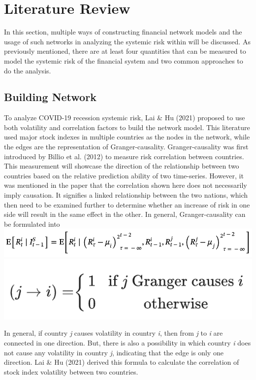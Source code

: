 \documentclass[a4paper,11pt]{article}
\begin{document}
\section{Literature Review}
In this section, multiple ways of constructing financial network models and the usage of such networks in analyzing the systemic risk within will be discussed. As previously mentioned, there are at least four quantities that can be measured to model the systemic risk of the financial system and two common approaches to do the analysis.

\subsection{Building Network}
To analyze COVID-19 recession systemic risk, Lai \& Hu (2021) proposed to use both volatility and correlation factors to build the network model. This literature used major stock indexes in multiple countries as the nodes in the network, while the edges are the representation of Granger-causality. Granger-causality was first introduced by Billio et al. (2012) to measure risk correlation between countries. This measurement will showcase the direction of the relationship between two countries based on the relative prediction ability of two time-series. However, it was mentioned in the paper that the correlation shown here does not necessarily imply causation. It signifies a linked relationship between the two nations, which then need to be examined further to determine whether an increase of risk in one side will result in the same effect in the other. In general, Granger-causality can be formulated into
\includegraphics[scale=0.5]{granger_causality_1.png}
\includegraphics[scale=0.5]{granger_causality_2.png}

In general, if country \textit{j} causes volatility in country \textit{i}, then from \textit{j} to \textit{i} are connected in one direction. But, there is also a possibility in which country \textit{i} does not cause any volatility in country \textit{j}, indicating that the edge is only one direction. Lai \& Hu (2021) derived this formula to calculate the correlation of stock index volatility between two countries.
\end{document}
